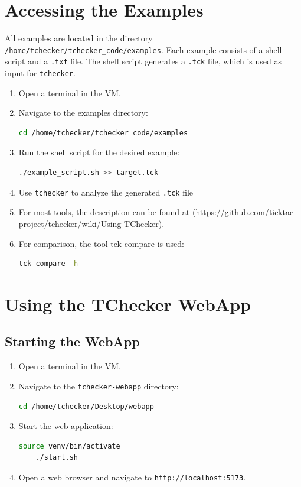 \documentclass{article}
\begin{document}
\section{Accessing the Examples}
\label{sec:accessing-the-examples}
All examples are located in the directory \texttt{/home/tchecker/tchecker\_code/examples}. Each example consists of a shell script and a \texttt{.txt} file. The shell script generates a \texttt{.tck} file, which is used as input for \texttt{tchecker}.

\begin{enumerate}
    \item Open a terminal in the VM.
    \item Navigate to the examples directory:
    \begin{lstlisting}[language=bash]
    cd /home/tchecker/tchecker_code/examples \end{lstlisting}
    \item Run the shell script for the desired example:
    \begin{lstlisting}[language=bash]
    ./example_script.sh >> target.tck \end{lstlisting}
    \item Use \texttt{tchecker} to analyze the generated \texttt{.tck} file 
    \item For most tools, the description can be found at (\href{https://github.com/ticktac-project/tchecker/wiki/Using-TChecker}{https://github.com/ticktac-project/tchecker/wiki/Using-TChecker}).
    \item For comparison, the tool tck-compare is used:
    \begin{lstlisting}[language=bash]
    tck-compare -h \end{lstlisting}
\end{enumerate}

\section{Using the TChecker WebApp}
\subsection{Starting the WebApp}
\begin{enumerate}
    \item Open a terminal in the VM.
    \item Navigate to the \texttt{tchecker-webapp} directory:
    \begin{lstlisting}[language=bash]
    cd /home/tchecker/Desktop/webapp \end{lstlisting}
    \item Start the web application:
    \begin{lstlisting}[language=bash]
    source venv/bin/activate 
    ./start.sh \end{lstlisting}
    \item Open a web browser and navigate to \texttt{http://localhost:5173}.
\end{enumerate}
\end{document}
